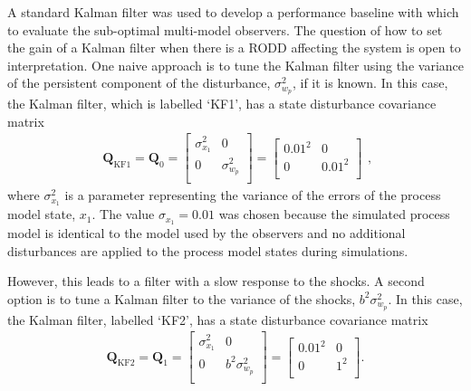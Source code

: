A standard Kalman filter was used to develop a performance baseline with which to evaluate the sub-optimal multi-model observers. The question of how to set the gain of a Kalman filter when there is a RODD affecting the system is open to interpretation. One naive approach is to tune the Kalman filter using the variance of the persistent component of the disturbance, $\sigma_{w_p}^2$, if it is known. In this case, the Kalman filter, which is labelled `KF1', has a state disturbance covariance matrix
\begin{equation} \label{eq:sim-sys-siso-KF1-Q}
	\begin{aligned}
		\mathbf{Q}_{\text{KF1}}=\mathbf{Q}_0=\begin{bmatrix}
			\sigma_{x_1}^2 & 0 \\
			0 &  \sigma_{w_p}^2 \\
		\end{bmatrix}=\begin{bmatrix}
		0.01^2 & 0 \\
		0 & 0.01^2 \\
	\end{bmatrix}
	\end{aligned},
\end{equation}
where $\sigma_{x_1}^2$ is a parameter representing the variance of the errors of the process model state, $x_1$. The value $\sigma_{x_1}=0.01$ was chosen because the simulated process model is identical to the model used by the observers and no additional disturbances are applied to the process model states during simulations.

However, this leads to a filter with a slow response to the shocks. A second option is to tune a Kalman filter to the variance of the shocks, $b^2\sigma_{w_p}^2$.  In this case, the Kalman filter, labelled `KF2', has a state disturbance covariance matrix
\begin{equation} \label{eq:sim-sys-siso-KF2-Q}
	\begin{aligned}
		\mathbf{Q}_{\text{KF2}}=\mathbf{Q}_1=\begin{bmatrix}
			\sigma_{x_1}^2 & 0 \\
			0 & b^2\sigma_{w_p}^2 \\
		\end{bmatrix}=\begin{bmatrix}
			0.01^2 & 0 \\
			0 & 1^2 \\
		\end{bmatrix}.
	\end{aligned}
\end{equation}

